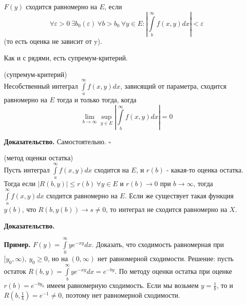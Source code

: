 \begin{defin}
$F(y)$ сходится равномерно на $E$, если
$$\forall \varepsilon>0~\exists b_0(\varepsilon)~\forall b>b_0~\forall y\in E:
\left| \int\limits_{b}^{\infty}f(x,y)dx\right|<\varepsilon$$
(то есть оценка не зависит от y).
\end{defin}
Как и с рядями, есть супремум-критерий.
\begin{theor}
    (супремум-критерий)\\
    Несобственный интеграл $\int\limits_{a}^{\infty} f(x,y)dx$, зависящий от
    параметра, сходится равномерно на $E$ тогда и только тогда, когда
    $$\lim\limits_{b\to \infty}\sup\limits_{y\in  E}\left| 
    \int\limits_{b}^{\infty}f(x,y)dx \right|=0$$
\end{theor}
\textbf{Доказательство.} Самостоятельно. 
$\square$ \\
\begin{theor} (метод оценки остатка)\\
Пусть интеграл $\int\limits_{a}^{\infty} f(x,y)dx$ сходится на $E$, и 
$r(b)$ - какая-то оценка остатка. Тогда если
 $|R(b,y)|\leqslant r(b)~\forall y\in E$ и $r(b)\to 0$ при  $b\to \infty$,
 тогда $\int\limits_{a}^{\infty}f(x,y)dx$ сходится равномерно на 
 $E$. Если же существует такая функция  $y(b)$, что $R(b,y(b))\to s\ne 0$,
 то интеграл не сходится равномерно на $X$.
\end{theor}
\textbf{Доказательство.} 


\textbf{Пример.} $F(y)=\int\limits_{0}^{\infty}ye^{-xy}dx$. Доказать, что 
сходимость равномерная при $[y_0,\infty),~y_0\geqslant0$, но на 
$(0,\infty)$ нет равномерной сходимости. Решение: пусть остаток
$R(b,y)=\int\limits_{b}^{\infty}ye^{-xy}dx=e^{-by}$. По методу оценки
остатка при оценке $r(b)=e^{-by_0}$ имеем равномерную сходимость.
Если мы возьмем $y=\frac{1}{b}$, то и $R(b,\frac{1}{b})=e^{-1}\ne0$, поэтому
нет равномерной сходимости. 




